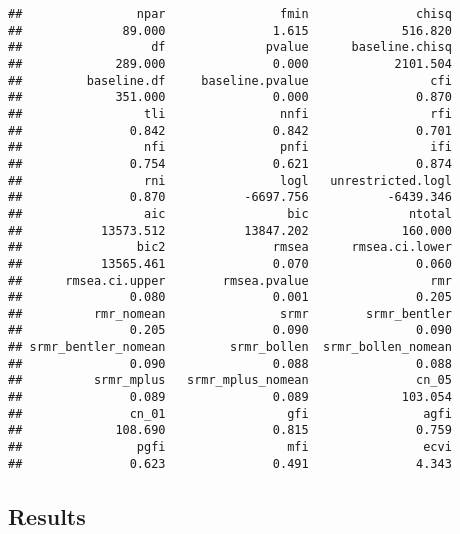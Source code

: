 \documentclass[english,man]{apa6}
\theoremstyle{definition}
\theoremstyle{definition}
\theoremstyle{definition}
\theoremstyle{remark}
\begin{document}
\begin{verbatim}
##                npar                fmin               chisq 
##              89.000               1.615             516.820 
##                  df              pvalue      baseline.chisq 
##             289.000               0.000            2101.504 
##         baseline.df     baseline.pvalue                 cfi 
##             351.000               0.000               0.870 
##                 tli                nnfi                 rfi 
##               0.842               0.842               0.701 
##                 nfi                pnfi                 ifi 
##               0.754               0.621               0.874 
##                 rni                logl   unrestricted.logl 
##               0.870           -6697.756           -6439.346 
##                 aic                 bic              ntotal 
##           13573.512           13847.202             160.000 
##                bic2               rmsea      rmsea.ci.lower 
##           13565.461               0.070               0.060 
##      rmsea.ci.upper        rmsea.pvalue                 rmr 
##               0.080               0.001               0.205 
##          rmr_nomean                srmr        srmr_bentler 
##               0.205               0.090               0.090 
## srmr_bentler_nomean         srmr_bollen  srmr_bollen_nomean 
##               0.090               0.088               0.088 
##          srmr_mplus   srmr_mplus_nomean               cn_05 
##               0.089               0.089             103.054 
##               cn_01                 gfi                agfi 
##             108.690               0.815               0.759 
##                pgfi                 mfi                ecvi 
##               0.623               0.491               4.343
\end{verbatim}

\subsection{Results}\label{results}
\end{document}
